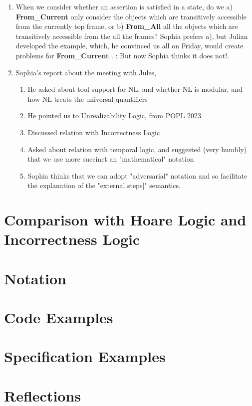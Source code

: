 \documentclass[11pt]{article} %
\theoremstyle{definition}
\begin{document}
\begin{enumerate}
\item
When we consider whether an assertion is satisfied in a state, do we a) \textbf{From\_Current} only consider the objects which are transitively accessible from the currently top frame, or b)  \textbf{From\_All} all the objects which are transitively accessible from the all the frames? Sophia prefers a), but Julian developed the  example, which, he convinced us all on Friday, would create problems for  \textbf{From\_Current} . \SP: But now Sophia thinks it does not!.
\item
Sophia's report about the meeting with Jules, 
\begin{enumerate}
\item 
He asked about tool support for NL, and whether NL is modular, and how NL treats the universal quantifiers 
\item
He pointed us to Unrealizability  Logic, from POPL 2023
\item
Discussed relation with Incorrectness Logic
\item
Asked about relation with temporal logic, and suggested (very humbly) that we use more succinct an "mathematical" notation
\item
Sophia thinks that we can adopt "adversarial" notation and so facilitate the explanation of the "external steps|" semantics.
\end{enumerate}
\end{enumerate}



\section{Comparison with Hoare Logic and Incorrectness Logic}


\section{Notation}


\section{Code Examples}


\section{Specification Examples}


\section{Reflections}

\end{document}
